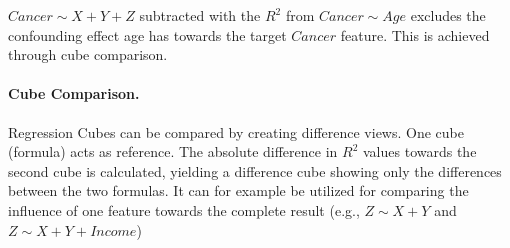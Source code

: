 \documentclass[journal]{style/vgtc} 			          %
\begin{document}
$Cancer \sim X + Y + Z$ subtracted with the $R^2$ from $Cancer \sim Age$ excludes the confounding effect age has towards the target $Cancer$ feature.
This is achieved through cube comparison.

\paragraph{Cube Comparison.}
Regression Cubes can be compared by creating difference views.
One cube (formula) acts as reference.
The absolute difference in $R^2$ values towards the second cube is calculated, yielding a difference cube showing only the differences between the two formulas.
It can for example be utilized for comparing the influence of one feature towards the complete result (e.g., $Z \sim X + Y$ and $Z \sim X + Y + Income$)
%
\end{document}
